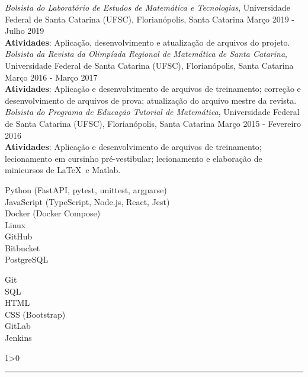 \documentclass[a4paper,10pt]{article}
\newcommand{\criaSecao}[4][0]{
	\begin{tcolorbox}[
        blanker,
        breakable,
        title=\begin{minipage}{0.16\linewidth}\large{\textbf{#2}}\vspace{-#3\baselineskip}\end{minipage},
        coltitle=black,
        leftupper=0.21\linewidth,
    ]
        #4
		\ifnum0#1>0 { \hrule {\ } } \fi
    \end{tcolorbox}
}
\begin{document}
{		\textit{Bolsista do Laboratório de Estudos de Matemática e Tecnologias}, Universidade Federal de Santa Catarina (UFSC), Florianópolis, Santa Catarina \hfill Março 2019 - Julho 2019 \\
		\textbf{Atividades}: Aplicação, desenvolvimento e atualização de arquivos do projeto.\\

		\textit{Bolsista da Revista da Olimpíada Regional de Matemática de Santa Catarina}, Universidade Federal de Santa Catarina (UFSC), Florianópolis, Santa Catarina \hfill Março 2016 - Março 2017 \\
		\textbf{Atividades}: Aplicação e desenvolvimento de arquivos de treinamento; correção e desenvolvimento de arquivos de prova; atualização do arquivo mestre da revista.\\

		\textit{Bolsista do Programa de Educação Tutorial de Matemática}, Universidade Federal de Santa Catarina (UFSC), Florianópolis, Santa Catarina \hfill Março 2015 - Fevereiro 2016 \\
		\textbf{Atividades}: Aplicação e desenvolvimento de arquivos de treinamento; lecionamento em cursinho pré-vestibular; lecionamento e elaboração de minicursos de \LaTeX\ e Matlab. \\
    }

    \criaSecao[1]{Linguagens de programação e ferramentas}{4}{
        \large{\bf
			\begin{minipage}{0.65\linewidth}
				Python (FastAPI, pytest, unittest, argparse)\\
				JavaScript (TypeScript, Node.js, React, Jest)\\
				Docker (Docker Compose)\\
				Linux\\
				GitHub\\
				Bitbucket\\
				PostgreSQL\\
			\end{minipage}
			\begin{minipage}{0.35\linewidth}
				Git\\
				SQL\\
				HTML\\
				CSS (Bootstrap)\\
				GitLab\\
				Jenkins\\
				\vspace{\baselineskip}
			\end{minipage}
		}
    }
\end{document}
